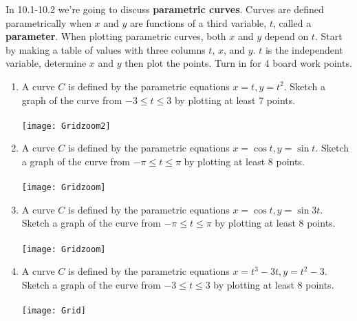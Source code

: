 \documentclass[12 pt]{article}
\begin{document}
In 10.1-10.2 we're going to discuss \textbf{parametric curves}. Curves are defined parametrically when $x$ and $y$ are functions of a third variable, $t$, called a \textbf{parameter}. When plotting parametric curves, both $x$ and $y$ depend on $t$. Start by making a table of values with three columns $t$, $x$, and $y$. $t$ is the independent variable, determine $x$ and $y$ then plot the points. Turn in for 4 board work points.

\begin{enumerate} 

\item A curve $C$ is defined by the parametric equations $x=t, y=t^2$.  Sketch a graph of the curve from $-3 \leq t \leq 3$ by plotting at least 7 points.  \\
\\
\texttt{[image: Gridzoom2]}


\item A curve $C$ is defined by the parametric equations $x=\cos t, y=\sin t$.  Sketch a graph of the curve from $-\pi \leq t \leq \pi$ by plotting at least 8 points.  \\
\\
\texttt{[image: Gridzoom]}


\newpage

\item A curve $C$ is defined by the parametric equations $x=\cos t, y=\sin 3t$.  Sketch a graph of the curve from $-\pi \leq t \leq \pi$ by plotting at least 8 points.  \\
\\
\texttt{[image: Gridzoom]}


\item A curve $C$ is defined by the parametric equations $x=t^3-3t, y=t^2-3$.  Sketch a graph of the curve from $-3 \leq t \leq 3$ by plotting at least 8 points.  \\
\\
\texttt{[image: Grid]}


\end{enumerate}
\end{document}

